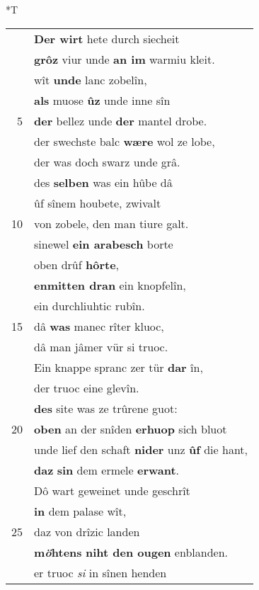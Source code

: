 \documentclass[8pt,a4paper,notitlepage]{article}
\begin{document}
\begin{table}[ht]
\begin{minipage}[t]{0.5\linewidth}
\end{minipage}
\hspace{0.5cm}
\begin{minipage}[t]{0.5\linewidth}
\small
\begin{center}*T
\end{center}
\begin{tabular}{rl}
 & \textbf{Der wirt} hete durch siecheit\\ 
 & \textbf{grôz} viur unde \textbf{an im} warmiu kleit.\\ 
 & wît \textbf{unde} lanc zobelîn,\\ 
 & \textbf{als} muose \textbf{ûz} unde inne sîn\\ 
5 & \textbf{der} bellez unde \textbf{der} mantel drobe.\\ 
 & der swechste balc \textbf{wære} wol ze lobe,\\ 
 & der was doch swarz unde grâ.\\ 
 & des \textbf{selben} was ein hûbe dâ\\ 
 & ûf sînem houbete, zwivalt\\ 
10 & von zobele, den man tiure galt.\\ 
 & sinewel \textbf{ein arabesch} borte\\ 
 & oben drûf \textbf{hôrte},\\ 
 & \textbf{enmitten dran} ein knopfelîn,\\ 
 & ein durchliuhtic rubîn.\\ 
15 & dâ \textbf{was} manec rîter kluoc,\\ 
 & dâ man jâmer vür si truoc.\\ 
 & Ein knappe spranc zer tür \textbf{dar} în,\\ 
 & der truoc eine glevîn.\\ 
 & \textbf{des} site was ze trûrene guot:\\ 
20 & \textbf{oben} an der snîden \textbf{erhuop} sich bluot\\ 
 & unde lief den schaft \textbf{nider} unz \textbf{ûf} die hant,\\ 
 & \textbf{daz} \textbf{si}\textbf{n} dem ermele \textbf{erwant}.\\ 
 & Dô wart geweinet unde geschrît\\ 
 & \textbf{in} dem palase wît,\\ 
25 & daz von drîzic landen\\ 
 & \textbf{m\textit{ö}htens} \textbf{niht den ougen} enblanden.\\ 
 & er truoc \textit{si} in sînen henden\\ 

\end{tabular}
\end{minipage}
\end{table}
\end{document}
